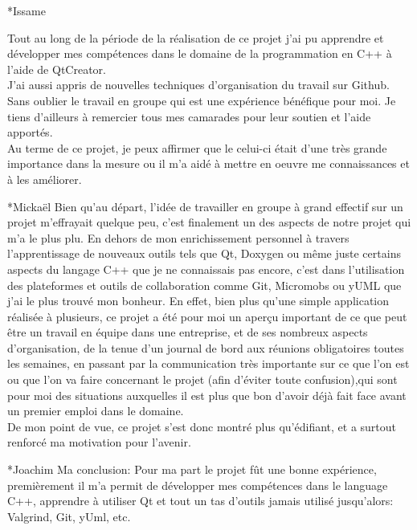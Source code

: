 \documentclass[a4paper, 12pt]{report}
\begin{document}
\begin{chapter}
		\begin{section}*{Issame}

		Tout au long de la période de la réalisation de ce projet j'ai pu apprendre et développer mes compétences dans le domaine de la programmation
		en C++ à l'aide de QtCreator.\\
		J'ai aussi appris de nouvelles techniques d'organisation du travail sur Github.\\
		Sans oublier le travail en groupe qui est une expérience bénéfique pour moi. Je tiens d'ailleurs à remercier tous mes camarades pour leur
		soutien et l'aide apportés.\\

		Au terme de ce projet, je peux affirmer que le celui-ci était d’une très grande importance dans la mesure ou il m’a aidé à mettre en oeuvre
		me connaissances et à les améliorer.

		\end{section}

		\begin{section}*{Mickaël}
		Bien qu'au départ, l'idée de travailler en groupe à grand effectif sur un projet m'effrayait quelque peu,
		c'est finalement un des aspects de notre projet qui m'a le plus plu.
		En dehors de mon enrichissement personnel à travers l'apprentissage de nouveaux outils tels que Qt, Doxygen ou même juste certains aspects du
		langage C++ que je ne connaissais pas encore, c'est dans l'utilisation des plateformes et outils de collaboration comme Git, Micromobs ou yUML
		que j'ai le plus trouvé mon bonheur. En effet, bien plus qu'une simple application réalisée à plusieurs, ce projet a été pour moi un aperçu
		important de ce que peut être un travail en équipe dans une entreprise, et de ses nombreux aspects d'organisation, de la tenue d'un journal de
		bord aux réunions obligatoires toutes les semaines, en passant par la communication très importante sur ce que l'on est ou que l'on va faire
		concernant le projet (afin d'éviter toute confusion),qui sont pour moi des situations auxquelles il est plus que bon d'avoir déjà fait face
		avant un premier emploi dans le domaine.\\
		De mon point de vue, ce projet s'est donc montré plus qu'édifiant, et a surtout renforcé ma motivation pour l'avenir.\\
		\end{section}

		\begin{section}*{Joachim}
		Ma conclusion: Pour ma part le projet fût une bonne expérience, premièrement il m'a permit de développer mes compétences dans le language
		C++, apprendre à utiliser Qt et tout un tas d'outils jamais utilisé jusqu'alors: Valgrind, Git, yUml, etc.\\


\end{section}
\end{chapter}
\end{document}
